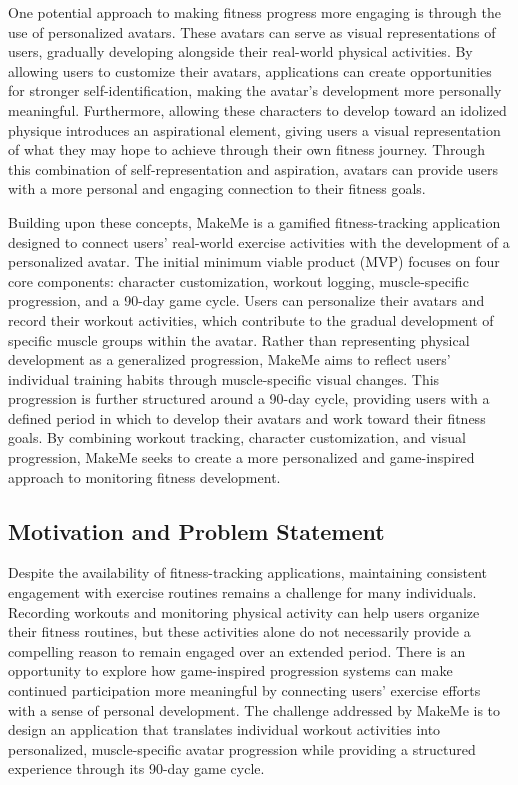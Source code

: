\documentclass[11pt]{article}
\begin{document}
One potential approach to making fitness progress more engaging is through the use of
personalized avatars. These avatars can serve as visual representations of users,
gradually developing alongside their real-world physical activities. By allowing users
to customize their avatars, applications can create opportunities for stronger
self-identification, making the avatar's development more personally meaningful.
Furthermore, allowing these characters to develop toward an idolized physique introduces
an aspirational element, giving users a visual representation of what they may hope to
achieve through their own fitness journey. Through this combination of self-representation
and aspiration, avatars can provide users with a more personal and engaging
connection to their fitness goals.

Building upon these concepts, MakeMe is a gamified fitness-tracking application designed
to connect users' real-world exercise activities with the development of a personalized
avatar. The initial minimum viable product (MVP) focuses on four core components:
character customization, workout logging, muscle-specific progression, and a 90-day game
cycle. Users can personalize their avatars and record their workout activities,
which contribute to the gradual development of specific muscle groups within the avatar.
Rather than representing physical development as a generalized progression, MakeMe aims
to reflect users' individual training habits through muscle-specific visual changes. This
progression is further structured around a 90-day cycle, providing users with a defined
period in which to develop their avatars and work toward their fitness goals. By combining
workout tracking, character customization, and visual progression, MakeMe seeks to create
a more personalized and game-inspired approach to monitoring fitness development.

\subsection{Motivation and Problem Statement}
Despite the availability of fitness-tracking applications, maintaining consistent
engagement with exercise routines remains a challenge for many individuals. Recording
workouts and monitoring physical activity can help users organize their fitness routines,
but these activities alone do not necessarily provide a compelling reason to remain engaged
over an extended period. There is an opportunity to explore how game-inspired progression
systems can make continued participation more meaningful by connecting users' exercise
efforts with a sense of personal development. The challenge addressed by MakeMe is to design
an application that translates individual workout activities into personalized,
muscle-specific avatar progression while providing a structured experience through its
90-day game cycle.
\end{document}
